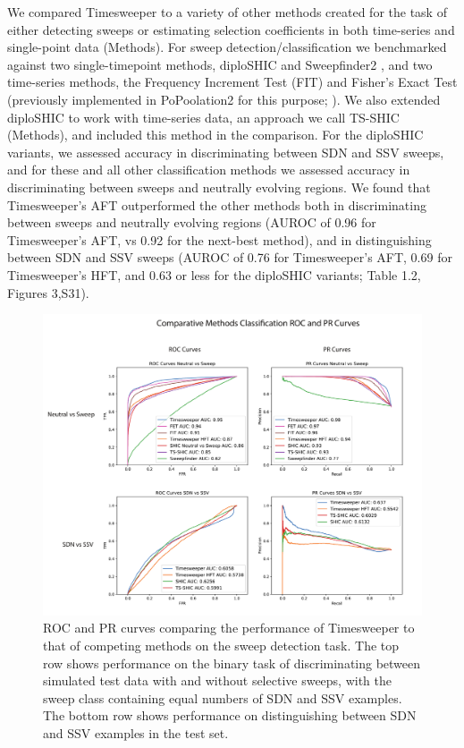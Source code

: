 We compared Timesweeper to a variety of other methods created for the task of either detecting sweeps or estimating selection coefficients in both time-series and single-point data (Methods). For sweep detection/classification we benchmarked against two single-timepoint methods, diploSHIC \cite{kernDiploSHICUpdated2018} and Sweepfinder2 \cite{degiorgioSweepFinder2IncreasedSensitivity2016}, and two time-series methods, the Frequency Increment Test (FIT) \cite{federIdentifyingSignaturesSelection2014} and Fisher’s Exact Test (previously implemented in PoPoolation2 for this purpose; \cite{koflerPoPoolation2IdentifyingDifferentiation2011}). We also extended diploSHIC to work with time-series data, an approach we call TS-SHIC (Methods), and included this method in the comparison. For the diploSHIC variants, we assessed accuracy in discriminating between SDN and SSV sweeps, and for these and all other classification methods we assessed accuracy in discriminating between sweeps and neutrally evolving regions. We found that Timesweeper’s AFT outperformed the other methods both in discriminating between sweeps and neutrally evolving regions (AUROC of 0.96 for Timesweeper’s AFT, vs 0.92 for the next-best method), and in distinguishing between SDN and SSV sweeps (AUROC of 0.76 for Timesweeper’s AFT, 0.69 for Timesweeper’s HFT, and 0.63 or less for the diploSHIC variants; Table 1.2, Figures 3,S31).

\begin{figure}
    \centering
    \includegraphics[width=\textwidth]{figures/ch1/Figure_3.pdf}
    \caption[Comparison of Timesweeper to competing methods]{ROC and PR curves comparing the performance of Timesweeper to that of competing methods on the sweep detection task. The top row shows performance on the binary task of discriminating between simulated test data with and without selective sweeps, with the sweep class containing equal numbers of SDN and SSV examples. The bottom row shows performance on distinguishing between SDN and SSV examples in the test set.}
    \label{fig:enter-label}
\end{figure}

